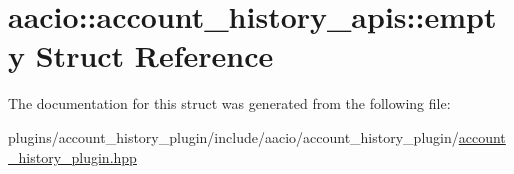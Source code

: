 \hypertarget{structaacio_1_1account__history__apis_1_1empty}{}\section{aacio\+:\+:account\+\_\+history\+\_\+apis\+:\+:empty Struct Reference}
\label{structaacio_1_1account__history__apis_1_1empty}


The documentation for this struct was generated from the following file\+:\begin{DoxyCompactItemize}
\item 
plugins/account\+\_\+history\+\_\+plugin/include/aacio/account\+\_\+history\+\_\+plugin/\mbox{\hyperlink{account__history__plugin_8hpp}{account\+\_\+history\+\_\+plugin.\+hpp}}\end{DoxyCompactItemize}
